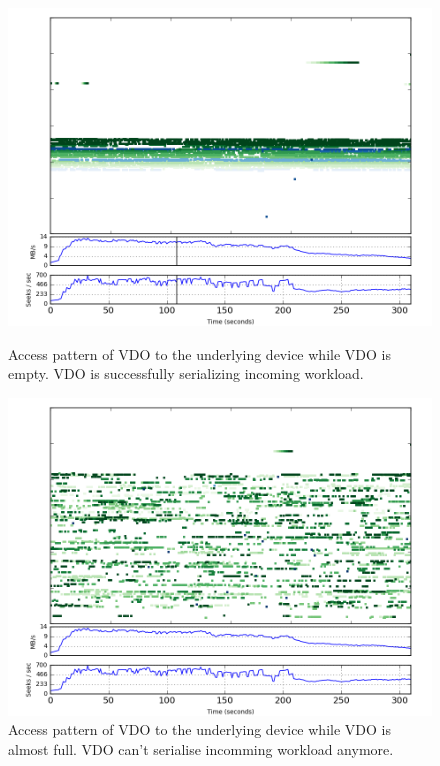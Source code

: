 \documentclass[
  color, %
  table, %
  lof,   %
  lot,   %
]{fithesis3}
\begin{document}
\begin{figure}[!htb]
        \centering
        \includegraphics[width=\textwidth]{../results/half/start}
\caption[Access pattern of VDO with enough free space]{Access pattern of VDO to the underlying device while VDO is empty. VDO is successfully serializing incoming workload.}
\label{fig:half-start}
        \centering
        \includegraphics[width=\textwidth]{../results/half/end}
\caption[Access pattern of VDO running out of free space]{Access pattern of VDO to the underlying device while VDO is almost full. VDO can't serialise incomming workload anymore.}
\label{fig:half-end}
\end{figure}
\end{document}
